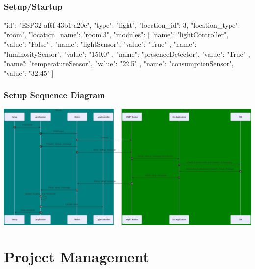 \documentclass{report}
\begin{document}
        \subsection{Setup/Startup}\label{subsec:setup/startup}

            \begin{termbox}
            {
                "id": "ESP32-af6f-43b1-a20e",
                "type": "light",
                "location_id": 3,
                "location_type": "room",
                "location_name": "room 3",
                "modules": [
                    {
                        "name": "lightController",
                        "value": "False"
                    },
                    {
                        "name": "lightSensor",
                        "value": "True"
                    },
                    {
                        "name": "luminositySensor",
                        "value": "150.0"
                    },
                    {
                        "name": "presenceDetector",
                        "value": "True"
                    },
                    {
                        "name": "temperatureSensor",
                        "value": "22.5"
                    },
                    {
                        "name": "consumptionSensor",
                        "value": "32.45"
                    }
                ]
            }
            \end{termbox}

        \subsection{Setup Sequence Diagram}\label{subsec:setup-sequence-diagram}

            \includegraphics[width=17cm]{ui/assets/img/setup-sequence-diagram}

\chapter{Project Management}\label{ch:project-management}
\end{document}
